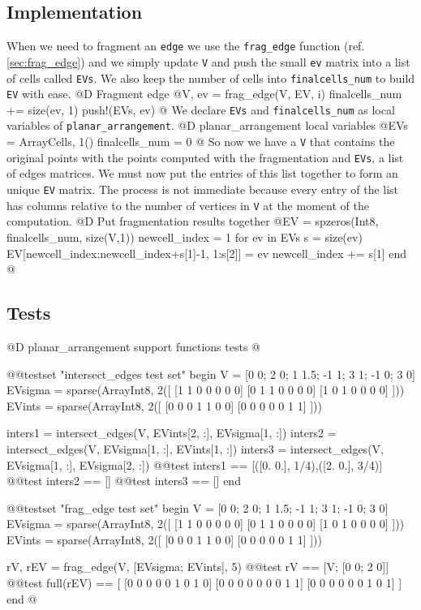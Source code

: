 \documentclass[10pt]{book}
\begin{document}
\subsection{Implementation}
When we need to fragment an \texttt{edge} we use the \texttt{frag\_edge} function (ref. \ref{sec:frag_edge}) 
and we simply update \texttt{V} and push the small \texttt{ev} matrix into a list of cells called \texttt{EVs}.
We also keep the number of cells into \texttt{finalcells\_num} to build \texttt{EV} with ease.
@D Fragment edge
@{V, ev = frag_edge(V, EV, i)
finalcells_num += size(ev, 1)
push!(EVs, ev)
@}
We declare \texttt{EVs} and \texttt{finalcells\_num} as local variables of \texttt{planar\_arrangement}.
@D planar\_arrangement local variables
@{EVs = Array{Cells, 1}()
finalcells_num = 0
@}
So now we have a \texttt{V} that contains the original points with the points computed with the fragmentation
and \texttt{EVs}, a list of edges matrices. We must now put the entries of this list together to form an unique
\texttt{EV} matrix. The process is not immediate because every entry of the list has columns relative to the 
number of vertices in \texttt{V} at the moment of the computation.
@D Put fragmentation results together
@{EV = spzeros(Int8, finalcells_num, size(V,1))
newcell_index = 1
for ev in EVs
    s = size(ev)
    EV[newcell_index:newcell_index+s[1]-1, 1:s[2]] = ev
    newcell_index += s[1]
end
@}
\subsection{Tests}
@D planar\_arrangement support functions tests
@{@@testset "intersect_edges test set" begin
    V = [0 0; 2 0; 1 1.5; -1 1; 3 1; -1 0; 3 0]
    EVsigma = sparse(Array{Int8, 2}([
        [1 1 0 0 0 0 0]
        [0 1 1 0 0 0 0]
        [1 0 1 0 0 0 0]
    ]))
    EVints = sparse(Array{Int8, 2}([
        [0 0 0 1 1 0 0]
        [0 0 0 0 0 1 1]
    ]))

    inters1 = intersect_edges(V, EVints[2, :], EVsigma[1, :])
    inters2 = intersect_edges(V, EVsigma[1, :], EVints[1, :])
    inters3 = intersect_edges(V, EVsigma[1, :], EVsigma[2, :])
    @@test inters1 == [([0. 0.], 1/4),([2. 0.], 3/4)]
    @@test inters2 == []
    @@test inters3 == []
end

@@testset "frag_edge test set" begin
    V = [0 0; 2 0; 1 1.5; -1 1; 3 1; -1 0; 3 0]
    EVsigma = sparse(Array{Int8, 2}([
        [1 1 0 0 0 0 0]
        [0 1 1 0 0 0 0]
        [1 0 1 0 0 0 0]
    ]))
    EVints = sparse(Array{Int8, 2}([
        [0 0 0 1 1 0 0]
        [0 0 0 0 0 1 1]
    ]))

    rV, rEV = frag_edge(V, [EVsigma; EVints], 5)
    @@test rV == [V; [0 0; 2 0]]
    @@test full(rEV) == [
        [0 0 0 0 0 1 0 1 0]
        [0 0 0 0 0 0 0 1 1]
        [0 0 0 0 0 0 1 0 1]
    ]
end
@}
\end{document}
